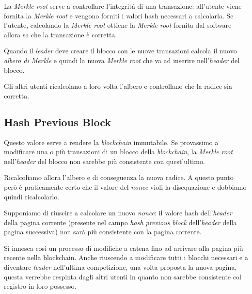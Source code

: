 La \emph{Merkle root} serve a controllare l'integrit\`a di una transazione: all'utente viene fornita la
\emph{Merkle root} e vengono forniti i valori hash necessari a calcolarla. Se l'utente, calcolando la \emph{Merkle root}
ottiene la \emph{Merkle root} fornita dal software allora sa che la transazione \`e corretta.

Quando il \emph{leader} deve creare il blocco con le nuove transazioni calcola il nuovo \emph{albero di Merkle} e quindi
la nuova \emph{Merkle root} che va ad inserire nell'\emph{header} del blocco.

Gli altri utenti ricalcolano a loro volta l'albero e controllano che la radice sia corretta.

\subsection{Hash Previous Block}
Questo valore serve a rendere la \emph{blockchain} immutabile. Se provassimo a modificare una o pi\`u transazioni di
un blocco della \emph{blockchain}, la \emph{Merkle root} nell'\emph{header} del blocco non sarebbe pi\`u consistente
con quest'ultimo.

Ricalcoliamo allora l'albero e di conseguenza la nuova radice. A questo punto per\`o \`e praticamente certo che il
valore del \emph{nonce} violi la disequazione e dobbiamo quindi ricalcolarlo.

Supponiamo di riuscire a calcolare un nuovo \emph{nonce}: il valore hash dell'\emph{header} della pagina corrente
(presente nel campo \emph{hash previous block} dell'\emph{header} della pagina successiva) non sar\`a pi\`u consistente
con la pagina corrente.

Si innesca cos\`i un processo di modifiche a catena fino ad arrivare alla pagina pi\`u recente nella blockchain. Anche
riuscendo a modificare tutti i blocchi necessari e a diventare \emph{leader} nell'ultima competizione, una volta
proposta la nuova pagina, questa verrebbe respinta dagli altri utenti in quanto non sarebbe consistente col registro
in loro possesso.

